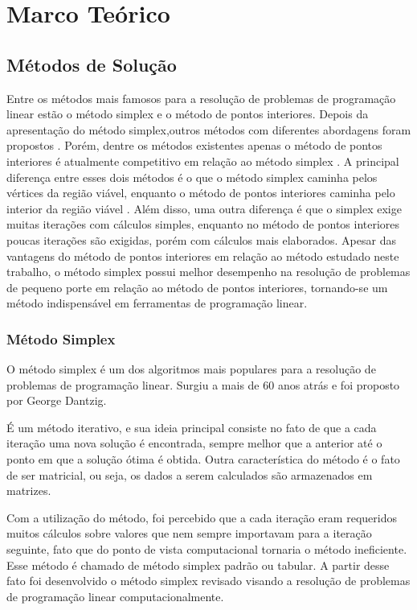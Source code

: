 \chapter{Marco Teórico}

\section{Métodos de Solução}
Entre os métodos mais famosos para a resolução de problemas de programação linear estão o método simplex  e o método de pontos interiores. 
Depois da apresentação do método simplex,outros métodos com diferentes abordagens foram propostos \cite{Todd}. Porém, dentre os métodos existentes apenas o método de pontos interiores é atualmente competitivo em relação ao método simplex . 
A principal diferença entre esses dois métodos é o que o método simplex caminha pelos vértices da região viável, enquanto o método de pontos interiores caminha pelo interior da região viável \cite{MaculanPI}. Além disso, uma outra diferença é que o simplex exige muitas iterações com cálculos simples, enquanto no método de pontos interiores poucas iterações são exigidas, porém com cálculos mais elaborados.
Apesar das vantagens do método de pontos interiores em relação ao método estudado neste trabalho, o método simplex possui melhor desempenho na resolução de problemas de pequeno porte em relação ao método de pontos interiores, tornando-se um método indispensável em ferramentas de programação linear.

\subsection{Método Simplex}
O método simplex é um dos algoritmos mais populares para a resolução de problemas de programação linear. Surgiu a mais de 60 anos atrás e foi proposto por George Dantzig.  

É um método iterativo, e sua ideia principal consiste no fato de que a cada iteração uma nova solução é encontrada, sempre melhor que a anterior até o ponto em que a solução ótima é obtida. Outra característica do método é o fato de ser matricial, ou seja, os dados a serem calculados são armazenados em matrizes.  

Com a utilização do método, foi percebido que a cada iteração eram requeridos muitos cálculos sobre valores que nem sempre importavam para a iteração seguinte, fato que do ponto de vista computacional tornaria o método ineficiente. Esse método é chamado de método simplex padrão ou tabular. A partir desse fato foi desenvolvido o método simplex revisado visando a resolução de problemas de programação linear computacionalmente.

